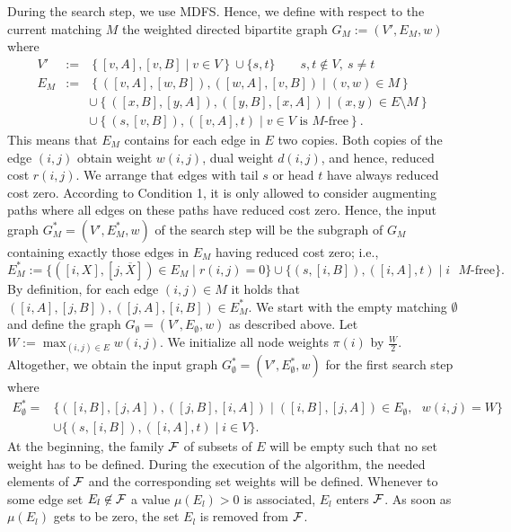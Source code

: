 \documentclass[12pt,twoside,a4paper]{article}
\begin{document}
During the search step, we use MDFS. Hence, we define with respect to the current 
matching $M$ the weighted directed bipartite graph $G_M := (V',E_M,w)$ where
\begin{eqnarray*}
V' &:=& \left\{[v,A],[v,B] \mid v\in V\right\}
       \cup \{s,t\} \qquad s,t\not\in V,\ s\not=t \\
E_M&:=& \left\{([v,A],[w,B]),([w,A],[v,B]) \mid (v,w)\in M\right\} \\
  & & \cup \left\{([x,B],[y,A]),([y,B],[x,A]) \mid (x,y)\in E\setminus M\right\} \\
  & & \cup \left\{(s,[v,B]), ([v,A],t) \mid v\in V \mbox{ is $M$-free}\right\}.
\end{eqnarray*}
This means that $E_M$ contains for each edge in $E$ two copies.
Both copies of the edge $(i,j)$ obtain weight $w(i,j)$, dual weight $d(i,j)$, and hence, 
reduced cost $r(i,j)$.
We arrange that edges with tail $s$ or head $t$ have always reduced cost zero. 
According to Condition 1,
it is only allowed to consider augmenting paths where all edges on these
paths have reduced cost zero. Hence, the input graph $G^*_M = (V',E^*_M,w)$ of the
search step will be the subgraph of $G_M$ containing exactly those edges in $E_M$ 
having reduced cost zero; i.e., 
$$E^*_M := \{([i,X],[j,\overline{X}]) \in E_M \mid r(i,j) = 0\} \cup 
\{(s,[i,B]),([i,A],t) \mid i \mbox{ $M$-free}\}.$$
By definition, for each edge $(i,j) \in M$ it holds that 
$([i,A],[j,B]), ([j,A],[i,B]) \in E^*_M$. We start with the empty matching $\emptyset$ 
and define the graph $G_{\emptyset} = (V',E_{\emptyset},w)$ as described above.
Let $W := \max_{(i,j) \in E} w(i,j)$. We initialize all node weights $\pi(i)$
by $\frac{W}{2}$. Altogether, we obtain the input graph 
$G^*_{\emptyset} = (V', E^*_{\emptyset},w)$ for the first search step where
$$\begin{array}{ll}
E^*_{\emptyset} = & \{([i,B],[j,A]), ([j,B],[i,A]) \mid ([i,B],[j,A]) \in 
E_{\emptyset}, \mbox{ } w(i,j) = W\}\\ 
     & \cup \{(s,[i,B]),([i,A],t)  \mid i \in V\}.
\end{array}$$
At the beginning, the family ${\cal F}$ of subsets of $E$ will be empty such 
that no set weight has to be defined. 
During the execution of the algorithm, the needed elements of ${\cal F}$ and the corresponding 
set weights will be defined. 
Whenever to some edge set $E_l \not\in \cal F$ a value
$\mu(E_l) > 0$ is associated, $E_l$ enters $\cal F$. 
As soon as $\mu(E_l)$ gets to be zero, the set $E_l$ is removed from $\cal F$.
\end{document}
